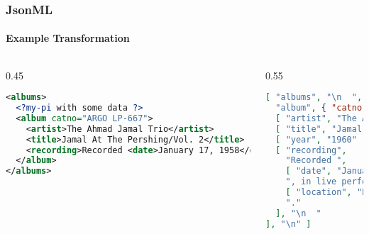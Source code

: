 \documentclass[
    alternativetitlepage=alternativ,
    cornerlogo=hgi_nds_logo2,
    sectionoverview,
]{rubpresentation}
\begin{document}
\begin{frame}[fragile]
    \frametitle{JsonML}
    \framesubtitle{Example Transformation}
    \begin{columns}[t]
        \begin{column}{0.45\textwidth}
                \begin{lstlisting}[language=xml,basicstyle=\fontsize{7}{11}\ttfamily,numbers=none]
<albums>
  <?my-pi with some data ?>
  <album catno="ARGO LP-667">
    <artist>The Ahmad Jamal Trio</artist>
    <title>Jamal At The Pershing/Vol. 2</title>
    <recording>Recorded <date>January 17, 1958</date>, in live performance at the <location>Pershing Lounge, Chicago</location>.</recording>
  </album>
</albums>
\end{lstlisting}
        \end{column}
        \begin{column}{0.55\textwidth}
                \begin{lstlisting}[language=json,basicstyle=\fontsize{7}{11}\ttfamily,numbers=none]
[ "albums", "\n  ", [
  "album", { "catno": "ARGO LP-667" }, "\n    ",
  [ "artist", "The Ahmad Jamal Trio" ], "\n    ",
  [ "title", "Jamal At The Pershing/Vol. 2" ], "\n    ",
  [ "year", "1960" ], "\n    ",
  [ "recording",
    "Recorded ",
    [ "date", "January 17, 1958" ],
    ", in live performance at the ",
    [ "location", "Pershing Lounge, Chicago" ],
    "."
  ], "\n  "
], "\n" ]
\end{lstlisting}
        \end{column}
    \end{columns}
\end{frame}
\end{document}
